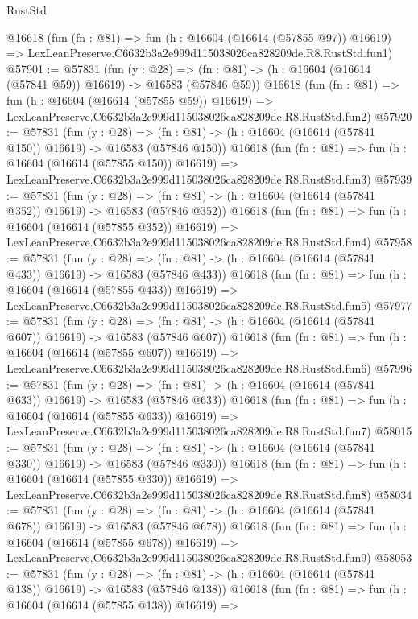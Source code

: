 \begin{lexlean}{RustStd}
\begin{coremodule}
    @16618
    (fun (fn : @81) =>
    fun (h : @16604 (@16614 (@57855 @97)) @16619) =>
    LexLeanPreserve.C6632b3a2e999d115038026ca828209de.R8.RustStd.fun1)
@57901 := @57831
    (fun (y : @28) =>
    (fn : @81) -> (h : @16604 (@16614 (@57841 @59)) @16619) -> @16583 (@57846 @59))
    @16618
    (fun (fn : @81) =>
    fun (h : @16604 (@16614 (@57855 @59)) @16619) =>
    LexLeanPreserve.C6632b3a2e999d115038026ca828209de.R8.RustStd.fun2)
@57920 := @57831
    (fun (y : @28) =>
    (fn : @81) -> (h : @16604 (@16614 (@57841 @150)) @16619) -> @16583 (@57846 @150))
    @16618
    (fun (fn : @81) =>
    fun (h : @16604 (@16614 (@57855 @150)) @16619) =>
    LexLeanPreserve.C6632b3a2e999d115038026ca828209de.R8.RustStd.fun3)
@57939 := @57831
    (fun (y : @28) =>
    (fn : @81) -> (h : @16604 (@16614 (@57841 @352)) @16619) -> @16583 (@57846 @352))
    @16618
    (fun (fn : @81) =>
    fun (h : @16604 (@16614 (@57855 @352)) @16619) =>
    LexLeanPreserve.C6632b3a2e999d115038026ca828209de.R8.RustStd.fun4)
@57958 := @57831
    (fun (y : @28) =>
    (fn : @81) -> (h : @16604 (@16614 (@57841 @433)) @16619) -> @16583 (@57846 @433))
    @16618
    (fun (fn : @81) =>
    fun (h : @16604 (@16614 (@57855 @433)) @16619) =>
    LexLeanPreserve.C6632b3a2e999d115038026ca828209de.R8.RustStd.fun5)
@57977 := @57831
    (fun (y : @28) =>
    (fn : @81) -> (h : @16604 (@16614 (@57841 @607)) @16619) -> @16583 (@57846 @607))
    @16618
    (fun (fn : @81) =>
    fun (h : @16604 (@16614 (@57855 @607)) @16619) =>
    LexLeanPreserve.C6632b3a2e999d115038026ca828209de.R8.RustStd.fun6)
@57996 := @57831
    (fun (y : @28) =>
    (fn : @81) -> (h : @16604 (@16614 (@57841 @633)) @16619) -> @16583 (@57846 @633))
    @16618
    (fun (fn : @81) =>
    fun (h : @16604 (@16614 (@57855 @633)) @16619) =>
    LexLeanPreserve.C6632b3a2e999d115038026ca828209de.R8.RustStd.fun7)
@58015 := @57831
    (fun (y : @28) =>
    (fn : @81) -> (h : @16604 (@16614 (@57841 @330)) @16619) -> @16583 (@57846 @330))
    @16618
    (fun (fn : @81) =>
    fun (h : @16604 (@16614 (@57855 @330)) @16619) =>
    LexLeanPreserve.C6632b3a2e999d115038026ca828209de.R8.RustStd.fun8)
@58034 := @57831
    (fun (y : @28) =>
    (fn : @81) -> (h : @16604 (@16614 (@57841 @678)) @16619) -> @16583 (@57846 @678))
    @16618
    (fun (fn : @81) =>
    fun (h : @16604 (@16614 (@57855 @678)) @16619) =>
    LexLeanPreserve.C6632b3a2e999d115038026ca828209de.R8.RustStd.fun9)
@58053 := @57831
    (fun (y : @28) =>
    (fn : @81) -> (h : @16604 (@16614 (@57841 @138)) @16619) -> @16583 (@57846 @138))
    @16618
    (fun (fn : @81) =>
    fun (h : @16604 (@16614 (@57855 @138)) @16619) =>

\end{coremodule}
\end{lexlean}
